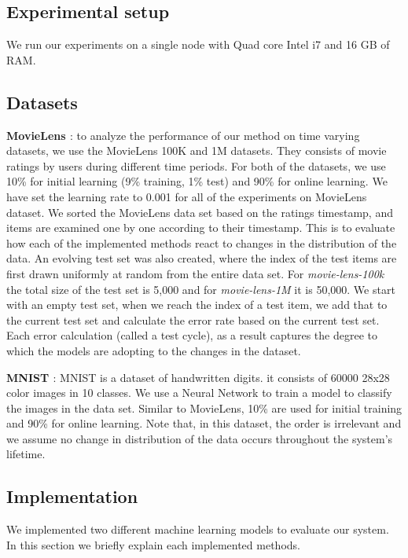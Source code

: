 \documentclass{sig-alternate-05-2015}
\begin{document}
\subsection{Experimental setup}
We run our experiments on a single node with Quad core Intel i7 and 16 GB of RAM. 

\subsection{Datasets}
\textbf{MovieLens \cite{harper2016movielens}}: to analyze the performance of our method on time varying datasets, we use the MovieLens 100K and 1M datasets. 
They consists of movie ratings by users during different time periods. 
For both of the datasets, we use 10\% for initial learning (9\% training, 1\% test) and 90\% for online learning. 
We have set the learning rate to 0.001 for all of the experiments on MovieLens dataset.
We sorted the MovieLens data set based on the ratings timestamp, and items are examined one by one according to their timestamp.
This is to evaluate how each of the implemented methods react to changes in the distribution of the data.
An evolving test set was also created, where the index of the test items are first drawn uniformly at random from the entire data set.
For \textit{movie-lens-100k} the total size of the test set is 5,000 and for \textit{movie-lens-1M} it is 50,000.
We start with an empty test set, when we reach the index of a test item, we add that to the current test set and calculate the error rate based on the current test set.
Each error calculation (called a test cycle), as a result captures the degree to which the models are adopting to the changes in the dataset.

\textbf{MNIST \cite{lecun-mnist}}: MNIST is a dataset of handwritten digits.
it consists of 60000 28x28 color images in 10 classes. We use a Neural Network to train a model to classify the images in the data set. 
Similar to MovieLens, 10\% are used for initial training and 90\% for online learning. 
Note that, in this dataset, the order is irrelevant and we assume no change in distribution of the data occurs throughout the system's lifetime. 

\subsection{Implementation}
We implemented two different machine learning models to evaluate our system.
In this section we briefly explain each implemented methods.
\end{document}
